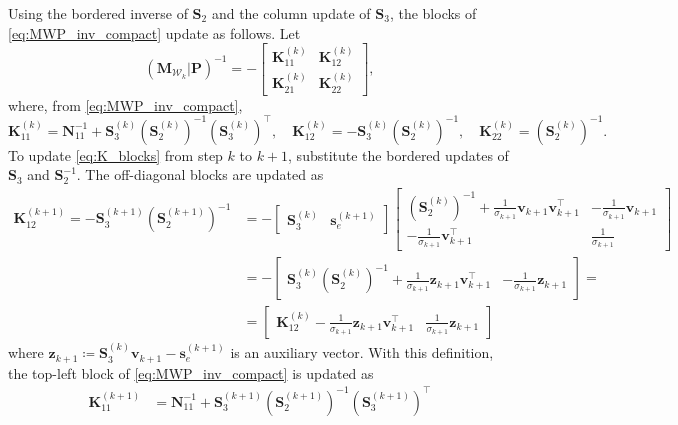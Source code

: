 \documentclass[a4paper,12pt,openany]{book}
\newcommand{\K}{\mathbf{K}}
\newcommand{\M}{\mathbf{M}}
\newcommand{\N}{\mathbf{N}}
\renewcommand{\P}{\mathbf{P}}
\newcommand{\s}{\mathbf{s}}
\renewcommand{\v}{\mathbf{v}}
\newcommand{\z}{\mathbf{z}}
\begin{document}
\begin{appendices}
Using the bordered inverse of $\mathbf{S}_2$ and the column update of $\mathbf{S}_3$, the blocks of \eqref{eq:MWP_inv_compact} update as follows. Let
\begin{equation}
	\label{eq:K_blocks}
	(\M_{\mathcal{W}_k}|\P)^{-1}
	=
	-\begin{bmatrix}
		\mathbf{K}_{11}^{(k)} & \mathbf{K}_{12}^{(k)} \\[4pt]
		\mathbf{K}_{21}^{(k)} & \mathbf{K}_{22}^{(k)}
	\end{bmatrix},
\end{equation}
where, from \eqref{eq:MWP_inv_compact},
\begin{equation}
	\label{eq:K_blocks_def}
	\mathbf{K}_{11}^{(k)}=\N_{11}^{-1}+\mathbf{S}_3^{(k)}(\mathbf{S}_2^{(k)})^{-1}(\mathbf{S}_3^{(k)})^\top,\quad
	\mathbf{K}_{12}^{(k)}=-\mathbf{S}_3^{(k)}(\mathbf{S}_2^{(k)})^{-1},\quad
	\mathbf{K}_{22}^{(k)}=(\mathbf{S}_2^{(k)})^{-1}.
\end{equation}
To update \eqref{eq:K_blocks} from step $k$ to $k+1$, substitute the bordered updates of $\mathbf{S}_3$ and $\mathbf{S}_2^{-1}$. The off-diagonal blocks are updated as
\begin{align}
	\K_{12}^{(k+1)}=-\mathbf{S}_3^{(k+1)}(\mathbf{S}_2^{(k+1)})^{-1}
	&=
	-\begin{bmatrix} \mathbf{S}_3^{(k)} & \s_e^{(k+1)} \end{bmatrix}
	\begin{bmatrix}
		(\mathbf{S}_2^{(k)})^{-1}+\frac{1}{\sigma_{k+1}}\v_{k+1}\v_{k+1}^\top & -\frac{1}{\sigma_{k+1}}\v_{k+1} \\[4pt]
		-\frac{1}{\sigma_{k+1}}\v_{k+1}^\top & \frac{1}{\sigma_{k+1}}
	\end{bmatrix} \nonumber \\
	&=
	-\begin{bmatrix}
		\mathbf{S}_3^{(k)}(\mathbf{S}_2^{(k)})^{-1}+\frac{1}{\sigma_{k+1}}\z_{k+1}\v_{k+1}^\top &
		-\frac{1}{\sigma_{k+1}}\z_{k+1}
	\end{bmatrix}= \nonumber \\
	&=\begin{bmatrix}
		\K_{12}^{(k)}-\frac{1}{\sigma_{k+1}}\z_{k+1}\v_{k+1}^\top &
		\frac{1}{\sigma_{k+1}}\z_{k+1}
	\end{bmatrix}
\end{align}
where $\z_{k+1}\coloneqq \mathbf{S}_3^{(k)}\v_{k+1}-\s_e^{(k+1)}$ is an auxiliary vector. With this definition, the top-left block of \eqref{eq:MWP_inv_compact} is updated as
\begin{align}
	\K_{11}^{(k+1)}&=\N_{11}^{-1}+\mathbf{S}_3^{(k+1)}(\mathbf{S}_2^{(k+1)})^{-1}(\mathbf{S}_3^{(k+1)})^\top

\end{align}
\end{appendices}
\end{document}
